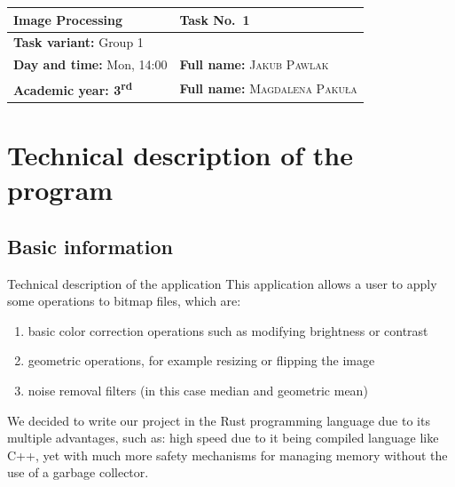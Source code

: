\documentclass[12pt]{article}
\theoremstyle{definition}
\begin{document}
\pagestyle{fancy}
\fancyhead{}
\fancyfoot[C]{\thepage}

\thispagestyle{empty}
\renewcommand{\arraystretch}{2}
\begin{flushleft}
    \begin{tabularx}{0.95\textwidth}{|X|X|}
        \hline
        \bf \large Image Processing                   & \bf \large Task No.~1                           \\ \hline
        \multicolumn{2}{|l|}{
            \textbf{Task variant:} Group 1
        }                                                                                               \\ \hline
        \textbf{Day and time:} Mon, 14:00             & \textbf{Full name:} \textsc{Jakub Pawlak}       \\
        \textbf{Academic year: 3\textsuperscript{rd}} & \textbf{Full name:} \textsc{Magdalena Paku\l a} \\
        \hline
    \end{tabularx}
\end{flushleft}
\vspace{1em}
\renewcommand{\arraystretch}{1}

\section{Technical description of the program}
\subsection{Basic information}

Technical description of the application
This application allows a user to apply some operations to bitmap files, which are:
\begin{enumerate}
    \item basic color correction operations such as modifying brightness or contrast
    \item geometric operations, for example resizing or flipping the image
    \item noise removal filters (in this case median and geometric mean)
\end{enumerate}
We decided to write our project in the Rust programming language due to its multiple advantages, such as:
high speed due to it being compiled language like C++, yet with much more safety mechanisms for managing memory without the use of a garbage collector.
\end{document}
